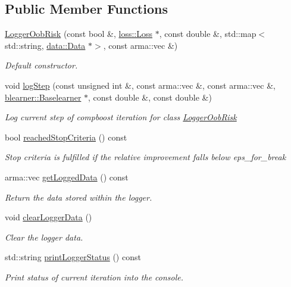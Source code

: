 \subsection*{Public Member Functions}
\begin{DoxyCompactItemize}
\item 
\hyperlink{classlogger_1_1_logger_oob_risk_a2ade553132c86f485d0057b2808ab028}{Logger\+Oob\+Risk} (const bool \&, \hyperlink{classloss_1_1_loss}{loss\+::\+Loss} $\ast$, const double \&, std\+::map$<$ std\+::string, \hyperlink{classdata_1_1_data}{data\+::\+Data} $\ast$$>$, const arma\+::vec \&)
\begin{DoxyCompactList}\small\item\em Default constructor. \end{DoxyCompactList}\item 
void \hyperlink{classlogger_1_1_logger_oob_risk_a4b0ea670a7970bca31037efab99cc06a}{log\+Step} (const unsigned int \&, const arma\+::vec \&, const arma\+::vec \&, \hyperlink{classblearner_1_1_baselearner}{blearner\+::\+Baselearner} $\ast$, const double \&, const double \&)
\begin{DoxyCompactList}\small\item\em Log current step of compboost iteration for class {\ttfamily \hyperlink{classlogger_1_1_logger_oob_risk}{Logger\+Oob\+Risk}} \end{DoxyCompactList}\item 
bool \hyperlink{classlogger_1_1_logger_oob_risk_a15c6792b0e1d2acbdd907f697f2884f3}{reached\+Stop\+Criteria} () const
\begin{DoxyCompactList}\small\item\em Stop criteria is fulfilled if the relative improvement falls below {\ttfamily eps\+\_\+for\+\_\+break} \end{DoxyCompactList}\item 
arma\+::vec \hyperlink{classlogger_1_1_logger_oob_risk_a1529f62cf58ad8bc5922a7d39ed3515e}{get\+Logged\+Data} () const
\begin{DoxyCompactList}\small\item\em Return the data stored within the logger. \end{DoxyCompactList}\item 
void \hyperlink{classlogger_1_1_logger_oob_risk_a8330dd8fd748c8ea1e0027f1b2c7ea50}{clear\+Logger\+Data} ()
\begin{DoxyCompactList}\small\item\em Clear the logger data. \end{DoxyCompactList}\item 
std\+::string \hyperlink{classlogger_1_1_logger_oob_risk_a446e3e0c3766c8cda1add83c09d2e968}{print\+Logger\+Status} () const
\begin{DoxyCompactList}\small\item\em Print status of current iteration into the console. \end{DoxyCompactList}\end{DoxyCompactItemize}
